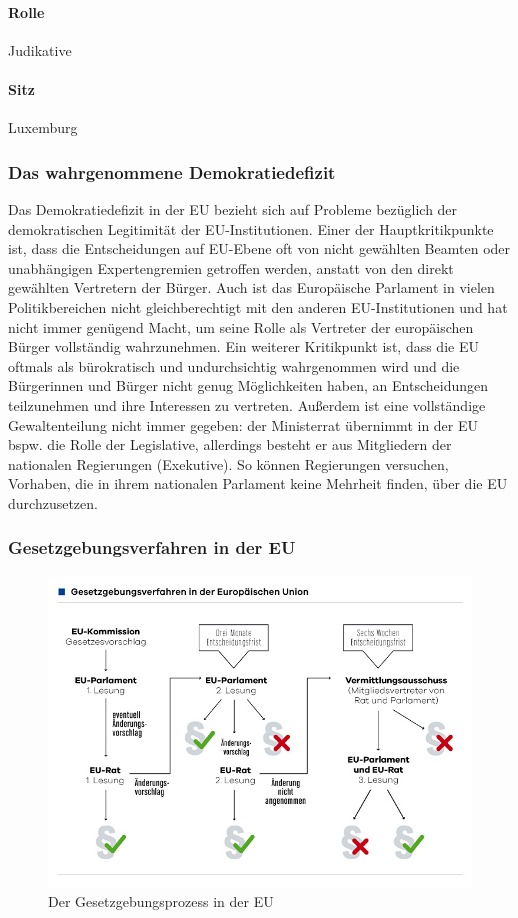 \documentclass{article}
\begin{document}
	\paragraph{Rolle}
	Judikative

	\paragraph{Sitz}
	Luxemburg

	\subsubsection{Das wahrgenommene Demokratiedefizit}
	Das Demokratiedefizit in der EU bezieht sich auf Probleme bezüglich der demokratischen Legitimität der EU-Institutionen. Einer der Hauptkritikpunkte ist, dass die Entscheidungen auf EU-Ebene oft von nicht gewählten Beamten oder unabhängigen Expertengremien getroffen werden, anstatt von den direkt gewählten Vertretern der Bürger. Auch ist das Europäische Parlament in vielen Politikbereichen nicht gleichberechtigt mit den anderen EU-Institutionen und hat nicht immer genügend Macht, um seine Rolle als Vertreter der europäischen Bürger vollständig wahrzunehmen. Ein weiterer Kritikpunkt ist, dass die EU oftmals als bürokratisch und undurchsichtig wahrgenommen wird und die Bürgerinnen und Bürger nicht genug Möglichkeiten haben, an Entscheidungen teilzunehmen und ihre Interessen zu vertreten. Außerdem ist eine vollständige Gewaltenteilung nicht immer gegeben: der Ministerrat übernimmt in der EU bspw. die Rolle der Legislative, allerdings besteht er aus Mitgliedern der nationalen Regierungen (Exekutive). So können Regierungen versuchen, Vorhaben, die in ihrem nationalen Parlament keine Mehrheit finden, über die EU durchzusetzen.

	\subsubsection{Gesetzgebungsverfahren in der EU}

	\begin{figure}[!ht]
		\centering
  		\includegraphics[width=45em]{eu_gesetzverfahren.jpg}
  		\caption{Der Gesetzgebungsprozess in der EU}
  		\label{fig:eu_gesetzverfahren}
	\end{figure}
\end{document}
